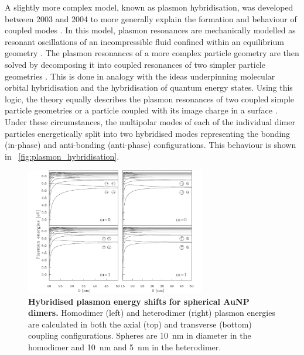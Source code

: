 \documentclass{article}
\begin{document}
A slightly more complex model, known as plasmon hybridisation, was developed between 2003 and 2004 to more generally explain the formation and behaviour of coupled modes \cite{prodan2003, prodan2004, nordlander2004}. In this model, plasmon resonances are mechanically modelled as resonant oscillations of an incompressible fluid confined within an equilibrium geometry \cite{prodan2004}. The plasmon resonances of a more complex particle geometry are then solved by decomposing it into coupled resonances of two simpler particle geometries \cite{prodan2003, prodan2004}. This is done in analogy with the ideas underpinning molecular orbital hybridisation and the hybridisation of quantum energy states. Using this logic, the theory equally describes the plasmon resonances of two coupled simple particle geometries \cite{nordlander2004} or a particle coupled with its image charge in a surface \cite{nordlander2004a}. Under these circumstances, the multipolar modes of each of the individual dimer particles energetically split into two hybridised modes representing the bonding (in-phase) and anti-bonding (anti-phase) configurations. This behaviour is shown in \figurename~\ref{fig:plasmon_hybridisation}.

\begin{figure}[bt]
\centering
\includegraphics[width=0.7\textwidth]{figures/literature/nordlander2004}
\caption[Hybridised plasmon energy shifts for spherical AuNP dimers]{\textbf{Hybridised plasmon energy shifts for spherical AuNP dimers.} Homodimer (left) and heterodimer (right) plasmon energies are calculated in both the axial (top) and transverse (bottom) coupling configurations. Spheres are \SI{10}{nm} in diameter in the homodimer and \SI{10}{nm} and \SI{5}{nm} in the heterodimer.}
\label{fig:nordlander_ph_modes}
\end{figure}
\end{document}
